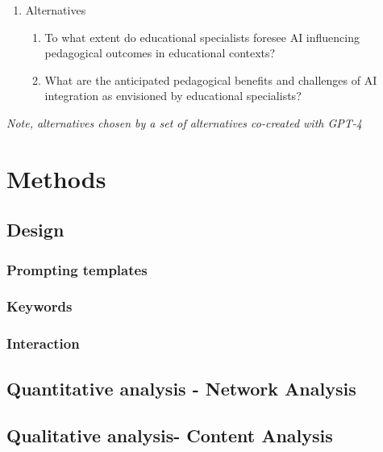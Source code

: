 \documentclass[sn-mathphys, Numbered]{sn-jnl}%
\theoremstyle{thmstyleone}%
\theoremstyle{thmstyletwo}%
\theoremstyle{thmstylethree}%
\begin{document}
\begin{enumerate}
    \begin{enumerate}
        \item [] Alternatives
        \begin{enumerate}
            \item To what extent do educational specialists foresee AI influencing pedagogical outcomes in educational contexts?
            \item What are the anticipated pedagogical benefits and challenges of AI integration as envisioned by educational specialists? 
        \end{enumerate}
    \end{enumerate}

\end{enumerate}
\textit{Note, alternatives chosen by a set of alternatives co-created with GPT-4 }



\section{Methods}\label{Methods}

\subsection{Design}\label{Interaction design}
\subsubsection{Prompting templates}
\subsubsection{Keywords}
\subsubsection{Interaction}

\subsection{Quantitative analysis - Network Analysis}\label{Quantitative Analysis}

\subsection{Qualitative analysis- Content Analysis}\label{Qualitative Analysis}
\end{document}
